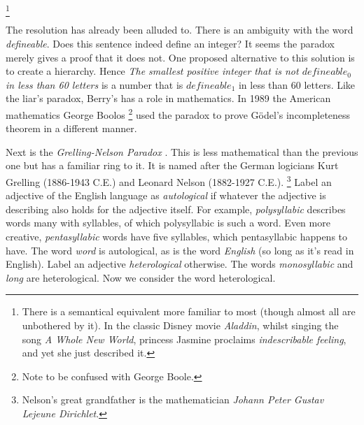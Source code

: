         \footnote{%
            There is a semantical equivalent more familiar to most (though
            almost all are unbothered by it). In the classic Disney movie
            \textit{Aladdin}, whilst singing the song
            \textit{A Whole New World}, princess Jasmine proclaims
            \textit{indescribable feeling}, and yet she just described it.
        }
        \par\hfill\par
        The resolution has already been alluded to. There is an ambiguity with
        the word \textit{defineable}. Does this sentence indeed define an
        integer? It seems the paradox merely gives a proof that it does not. One
        proposed alternative to this solution is to create a hierarchy. Hence
        \textit{The smallest positive integer that is not $defineable_{0}$}
        \textit{in less than 60 letters} is a number that is $defineable_{1}$ in
        less than 60 letters. Like the liar's paradox, Berry's has a role in
        mathematics. In 1989 the American mathematics George
        Boolos%
        \footnote{Note to be confused with George Boole.}
        used the paradox to prove G\"{o}del's incompleteness theorem in a
        different manner.
        \par\hfill\par
        Next is the \textit{Grelling-Nelson Paradox}%
        . This is
        less mathematical than the previous one but has a familiar ring to it.
        It is named after the German logicians Kurt
        Grelling (1886-1943 C.E.) and Leonard
        Nelson (1882-1927 C.E.).%
        \footnote{%
            Nelson's great grandfather is the mathematician
            \textit{Johann Peter Gustav Lejeune Dirichlet}.%
        }
        Label an adjective of the English language as \textit{autological} if
        whatever the adjective is describing also holds for the adjective
        itself. For example, \textit{polysyllabic} describes words many with
        syllables, of which polysyllabic is such a word. Even more creative,
        \textit{pentasyllabic} words have five syllables, which pentasyllabic
        happens to have. The word \textit{word} is autological, as is the word
        \textit{English} (so long as it's read in English). Label an adjective
        \textit{heterological} otherwise. The words \textit{monosyllabic} and
        \textit{long} are heterological. Now we consider the word heterological.
